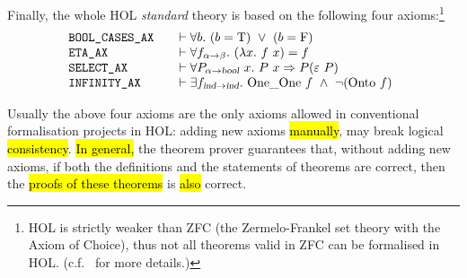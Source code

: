 Finally, the whole HOL \emph{standard} theory is based on the
following four axioms:\footnote{HOL is strictly
  weaker than ZFC (the Zermelo-Frankel set theory with the
Axiom of Choice), thus not all theorems valid in ZFC can be formalised
in HOL. (c.f.~\cite{hollogic} for more details.)}
\begin{equation*}
\begin{array}{@{}l@{\qquad}l}
\mbox{\texttt{BOOL\_CASES\_AX}} &\vdash \uquant{b} (b = \T )\ \vee \ (b = \F )\\
\mbox{\texttt{ETA\_AX}} &
\vdash \uquant{f_{\alpha\fun\beta}}(\lquant{x}f\ x) = f\\
\mbox{\texttt{SELECT\_AX}} &
\vdash \uquant{P_{\alpha\fun\ty{bool}}\ x} P\ x \imp P({\hilbert}\ P)\\
\mbox{\texttt{INFINITY\_AX}}&
\vdash \equant{f_{\ind\fun \ind}} \OneOne \ f \conj \neg(\Onto \ f)\\
\end{array}
\end{equation*}

Usually the above four axioms are the only axioms allowed
in conventional formalisation projects in HOL: adding new axioms
\hl{manually}, may break logical \hl{consistency}.
\hl{In general,} the theorem prover guarantees that,
without adding new axioms, if both the definitions and the statements
of theorems are correct, then the \hl{proofs of these theorems} is
 \hl{also} correct.
%

